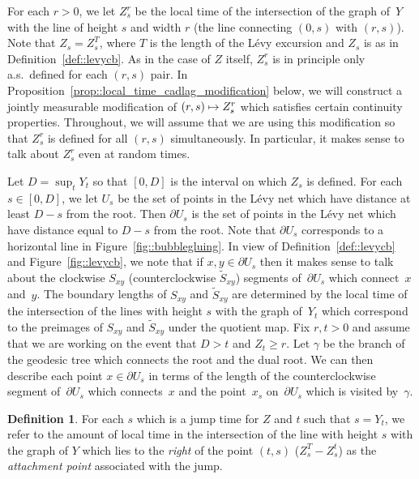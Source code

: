 \documentclass[10pt]{amsart}
\newcommand\mto{\mathchoice{\longmapsto}{\mapsto}{\mapsto}{\mapsto}}
\theoremstyle{plain}
\numberwithin{theorem}{section}
\theoremstyle{definition}
\newtheorem{definition}[theorem]{Definition}
\let\wt\widetilde
\begin{document}
For each $r > 0$, we let $Z_s^r$ be the local time of the intersection of the graph of~$Y$ with the line of height $s$ and width $r$ (\ie the line connecting $(0,s)$ with $(r,s)$). Note that $Z_s = Z_s^T$, where $T$ is the length of the Lévy excursion and $Z_s$ is as in Definition~\ref{def::levycb}. As in the case of $Z$ itself, $Z_s^r$ is in principle only a.s.\ defined for each $(r,s)$ pair. In Proposition~\ref{prop::local_time_cadlag_modification} below, we will construct a jointly measurable modification of $(r,s) \mto Z_s^r$ which satisfies certain continuity properties. Throughout, we will assume that we are using this modification so that $Z_s^r$ is defined for all $(r,s)$ simultaneously. In particular, it makes sense to talk about $Z_s^r$ even at random times.

Let $D = \sup_t Y_t$ so that $[0,D]$ is the interval on which $Z_s$ is defined. For each $s \in [0,D]$, we let $U_s$ be the set of points in the Lévy net which have distance at least $D-s$ from the root. Then $\partial U_s$ is the set of points in the Lévy net which have distance equal to $D-s$ from the root. Note that $\partial U_s$ corresponds to a horizontal line in Figure~\ref{fig::bubblegluing}. In view of Definition~\ref{def::levycb} and Figure~\ref{fig::levycb}, we note that if $x,y \in \partial U_s$ then it makes sense to talk about the clockwise $S_{xy}$ (\resp counterclockwise $\wt{S}_{xy}$) segments of~$\partial U_s$ which connect~$x$ and~$y$. The boundary lengths of $S_{xy}$ and $\wt{S}_{xy}$ are determined by the local time of the intersection of the lines with height $s$ with the graph of~$Y_t$ which correspond to the preimages of $S_{xy}$ and $\wt{S}_{xy}$ under the quotient map. Fix $r,t > 0$ and assume that we are working on the event that $D > t$ and $Z_t \geq r$. Let $\gamma$ be the branch of the geodesic tree which connects the root and the dual root. We can then describe each point $x \in \partial U_s$ in terms of the length of the counterclockwise segment of~$\partial U_s$ which connects~$x$ and the point~$x_s$ on~$\partial U_s$ which is visited by~$\gamma$.

\begin{definition}
\label{def::levy_attachment_points}
For each $s$ which is a jump time for $Z$ and $t$ such that $s = Y_t$, we refer to the amount of local time in the intersection of the line with height $s$ with the graph of $Y$ which lies to the \emph{right} of the point $(t,s)$ (\ie $Z_s^T - Z_s^t$) as the \emph{attachment point} associated with the jump.
\end{definition}
\end{document}
